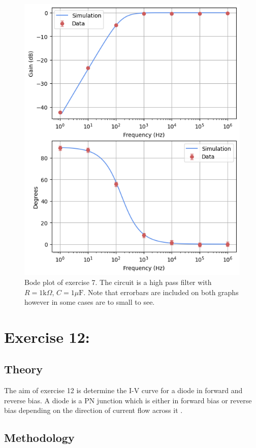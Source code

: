\documentclass[%
reprint,
amsmath,amssymb,
aps,
floatfix
]{revtex4-2}
\begin{document}
		\begin{figure}
			\includegraphics[width=0.85\columnwidth]{ex7_dualPlot.png}
			\caption{\label{fig:ex7Results}Bode plot of exercise 7. The circuit is a high pass filter with $R = 1 \text{k}\Omega$, $C = 1 \mu\text{F}$. Note that errorbars are included on both graphs however in some cases are to small to see.}
		\end{figure}
		
	\section{Exercise 12: }
		\subsection{Theory}
		The aim of exercise 12 is determine the I-V curve for a diode in forward and reverse bias. A diode is a PN junction which is either in forward bias or reverse bias depending on the direction of current flow across it \cite{manual}. 
		
		\subsection{Methodology}
		
\end{document}
